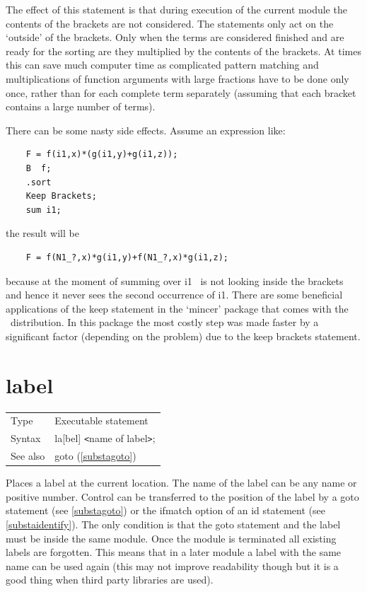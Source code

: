 \noindent The effect 
of this statement is that during execution of the current module the 
contents of the brackets are not considered. The statements only act on the 
`outside' of the brackets. Only when the terms are considered finished and 
are ready for the sorting are they multiplied by the contents of the 
brackets. At times this can save much computer time as complicated pattern 
matching and multiplications of function arguments with large fractions 
have to be done only once, rather than for each complete term separately 
(assuming that each bracket contains a large number of terms).

\noindent There can be some nasty side effects. Assume an expression like:
\begin{verbatim}
    F = f(i1,x)*(g(i1,y)+g(i1,z));
    B  f;
    .sort
    Keep Brackets;
    sum i1;
\end{verbatim}
the result will be
\begin{verbatim}
    F = f(N1_?,x)*g(i1,y)+f(N1_?,x)*g(i1,z);
\end{verbatim}
because at the moment of summing over i1 \FORM\ is not looking inside the 
brackets and hence it never sees the second occurrence of i1. There are 
some beneficial applications of the keep statement in the 
`mincer' package that comes with the \FORM\ distribution. In 
this package the most costly step was made faster by a significant factor 
(depending on the problem) due to the keep brackets statement. 
\vspace{10mm}


\section{label}
\label{substalabel}

\noindent \begin{tabular}{ll}
Type & Executable statement\\
Syntax & la[bel] {\tt<}name of label{\tt>};
\\ See also & goto (\ref{substagoto})
\end{tabular} \vspace{4mm}

\noindent Places a label at the current location. The name of 
the label can be any name or positive number. Control can be transferred to the 
position of the label by a goto statement (see 
\ref{substagoto}) or the ifmatch option of an id statement 
(see \ref{substaidentify}). The only condition is that the goto statement 
and the label must be inside the same module. Once the module is terminated 
all existing labels are forgotten. This means that in a later module a 
label with the same name can be used again (this may not improve 
readability though but it is a good thing when third party libraries are 
used). \vspace{10mm}

